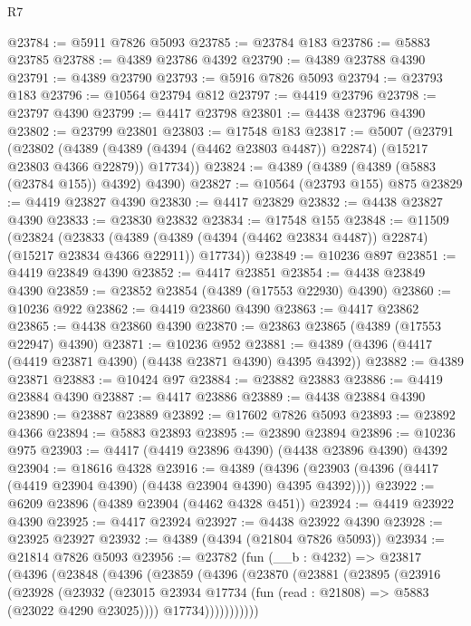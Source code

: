 \begin{lexlean}{R7}
\begin{coremodule}
@23784 := @5911 @7826 @5093
@23785 := @23784 @183
@23786 := @5883 @23785
@23788 := @4389 @23786 @4392
@23790 := @4389 @23788 @4390
@23791 := @4389 @23790
@23793 := @5916 @7826 @5093
@23794 := @23793 @183
@23796 := @10564 @23794 @812
@23797 := @4419 @23796
@23798 := @23797 @4390
@23799 := @4417 @23798
@23801 := @4438 @23796 @4390
@23802 := @23799 @23801
@23803 := @17548 @183
@23817 := @5007
    (@23791
      (@23802
        (@4389 (@4389 (@4394 (@4462 @23803 @4487)) @22874) (@15217 @23803 @4366 @22879))
        @17734))
@23824 := @4389 (@4389 (@4389 (@5883 (@23784 @155)) @4392) @4390)
@23827 := @10564 (@23793 @155) @875
@23829 := @4419 @23827 @4390
@23830 := @4417 @23829
@23832 := @4438 @23827 @4390
@23833 := @23830 @23832
@23834 := @17548 @155
@23848 := @11509
    (@23824
      (@23833
        (@4389 (@4389 (@4394 (@4462 @23834 @4487)) @22874) (@15217 @23834 @4366 @22911))
        @17734))
@23849 := @10236 @897
@23851 := @4419 @23849 @4390
@23852 := @4417 @23851
@23854 := @4438 @23849 @4390
@23859 := @23852 @23854 (@4389 (@17553 @22930) @4390)
@23860 := @10236 @922
@23862 := @4419 @23860 @4390
@23863 := @4417 @23862
@23865 := @4438 @23860 @4390
@23870 := @23863 @23865 (@4389 (@17553 @22947) @4390)
@23871 := @10236 @952
@23881 := @4389 (@4396 (@4417 (@4419 @23871 @4390) (@4438 @23871 @4390) @4395 @4392))
@23882 := @4389 @23871
@23883 := @10424 @97
@23884 := @23882 @23883
@23886 := @4419 @23884 @4390
@23887 := @4417 @23886
@23889 := @4438 @23884 @4390
@23890 := @23887 @23889
@23892 := @17602 @7826 @5093
@23893 := @23892 @4366
@23894 := @5883 @23893
@23895 := @23890 @23894
@23896 := @10236 @975
@23903 := @4417 (@4419 @23896 @4390) (@4438 @23896 @4390) @4392
@23904 := @18616 @4328
@23916 := @4389
    (@4396 (@23903 (@4396 (@4417 (@4419 @23904 @4390) (@4438 @23904 @4390) @4395 @4392))))
@23922 := @6209 @23896 (@4389 @23904 (@4462 @4328 @451))
@23924 := @4419 @23922 @4390
@23925 := @4417 @23924
@23927 := @4438 @23922 @4390
@23928 := @23925 @23927
@23932 := @4389 (@4394 (@21804 @7826 @5093))
@23934 := @21814 @7826 @5093
@23956 := @23782
    (fun (__b : @4232) =>
    @23817
      (@4396
        (@23848
          (@4396
            (@23859
              (@4396
                (@23870
                  (@23881
                    (@23895
                      (@23916
                        (@23928
                          (@23932
                            (@23015
                              @23934
                              @17734
                              (fun (read : @21808) => @5883 (@23022 @4290 @23025))))
                          @17734)))))))))))

\end{coremodule}
\end{lexlean}
